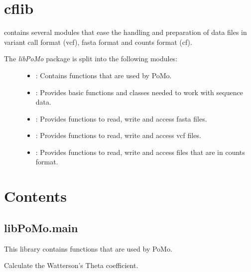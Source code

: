 \documentclass[letterpaper,10pt,english]{sphinxmanual}
\begin{document}
\chapter{cflib}
\label{index:welcome-to-the-documentation-of-cflib}\label{index:cflib}
 contains several modules that ease the handling and
preparation of data files in variant call format (vcf), fasta format
and counts format (cf).
\begin{description}
\item[{The \emph{libPoMo} package is split into the following modules:}] \leavevmode\begin{itemize}
\item {} 
{\hyperref[main::doc]{}}: Contains functions that are used by PoMo.

\item {} 
{\hyperref[seqbase::doc]{}}: Provides basic functions and classes
needed to work with sequence data.

\item {} 
{\hyperref[fasta::doc]{}}: Provides functions to read, write and access
fasta files.

\item {} 
{\hyperref[vcf::doc]{}}: Provides functions to read, write and access vcf
files.

\item {} 
{\hyperref[cf::doc]{}}: Provides functions to read, write and access files
that are in counts format.

\end{itemize}

\end{description}


\chapter{Contents}
\label{index:contents}\label{main:module-libPoMo.main}

\section{libPoMo.main}
\label{main:libpomo-main}\label{main::doc}
This library contains functions that are used by PoMo.

\begin{fulllineitems}
\label{main:libPoMo.main.a}
Calculate the Watterson's Theta coefficient.

\end{fulllineitems}
\end{document}
